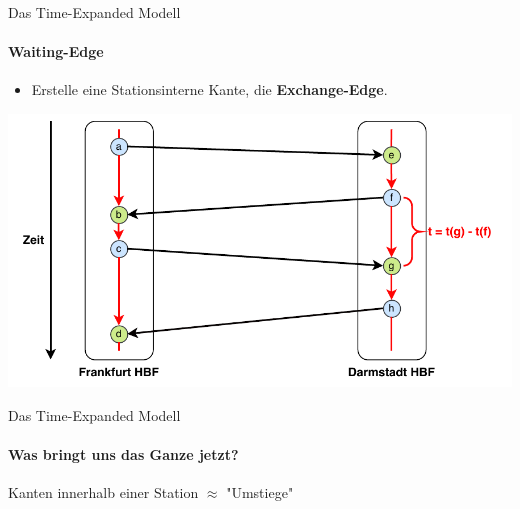 \begin{frame}{Das Time-Expanded Modell}
\framesubtitle{Waiting-Edge}
	\begin{itemize}
		\item Erstelle eine Stationsinterne Kante, die \textbf{Exchange-Edge}. 
	\end{itemize}

	\begin{center}
	\hspace{5em}
		\includegraphics[width=.78\linewidth]{images/time-expanded-basic-2.pdf} 
	\end{center}
\end{frame}


\begin{frame}{Das Time-Expanded Modell}
\framesubtitle{Was bringt uns das Ganze jetzt?}
\vspace{6em}
\begin{center}
	\begin{LARGE}
		Kanten innerhalb einer Station $\approx$ "{}Umstiege"{}
	\end{LARGE}
\end{center}
\end{frame}


